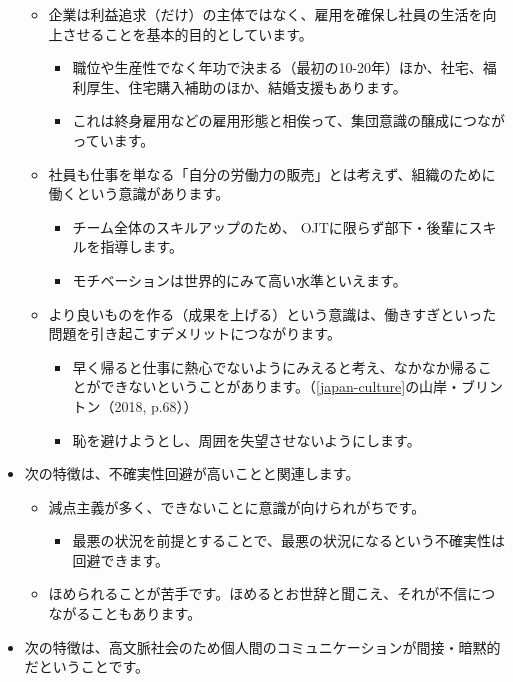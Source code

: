 \documentclass[
]{book}
\providecommand{\tightlist}{%
  \setlength{\itemsep}{0pt}\setlength{\parskip}{0pt}}
\begin{document}
\begin{itemize}
  \begin{itemize}
  \item
    企業は利益追求（だけ）の主体ではなく、雇用を確保し社員の生活を向上させることを基本的目的としています。

    \begin{itemize}
    \item
      職位や生産性でなく年功で決まる（最初の10-20年）ほか、社宅、福利厚生、住宅購入補助のほか、結婚支援もあります。
    \item
      これは終身雇用などの雇用形態と相俟って、集団意識の醸成につながっています。
    \end{itemize}
  \item
    社員も仕事を単なる「自分の労働力の販売」とは考えず、組織のために働くという意識があります。

    \begin{itemize}
    \item
      チーム全体のスキルアップのため、 OJTに限らず部下・後輩にスキルを指導します。
    \item
      モチベーションは世界的にみて高い水準といえます。
    \end{itemize}
  \item
    より良いものを作る（成果を上げる）という意識は、働きすぎといった問題を引き起こすデメリットにつながります。

    \begin{itemize}
    \item
      早く帰ると仕事に熱心でないようにみえると考え、なかなか帰ることができないということがあります。（\ref{japan-culture}の山岸・ブリントン（2018, p.68））
    \item
      恥を避けようとし、周囲を失望させないようにします。
    \end{itemize}
  \end{itemize}
\item
  次の特徴は、不確実性回避が高いことと関連します。

  \begin{itemize}
  \item
    減点主義が多く、できないことに意識が向けられがちです。

    \begin{itemize}
    \tightlist
    \item
      最悪の状況を前提とすることで、最悪の状況になるという不確実性は回避できます。
    \end{itemize}
  \item
    ほめられることが苦手です。ほめるとお世辞と聞こえ、それが不信につながることもあります。
  \end{itemize}
\item
  次の特徴は、高文脈社会のため個人間のコミュニケーションが間接・暗黙的だということです。


\end{itemize}
\end{document}
